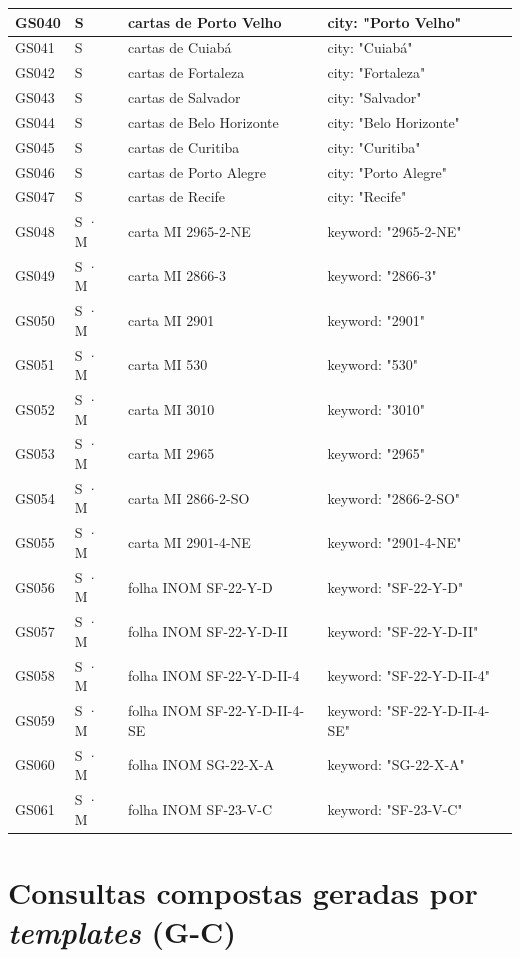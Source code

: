 {\begin{longtable}{|p{1.1cm}|p{1.3cm}|p{5.4cm}|p{6.3cm}|}
GS040 & S & cartas de Porto Velho & city: "Porto Velho" \\ \hline
GS041 & S & cartas de Cuiabá & city: "Cuiabá" \\ \hline
GS042 & S & cartas de Fortaleza & city: "Fortaleza" \\ \hline
GS043 & S & cartas de Salvador & city: "Salvador" \\ \hline
GS044 & S & cartas de Belo Horizonte & city: "Belo Horizonte" \\ \hline
GS045 & S & cartas de Curitiba & city: "Curitiba" \\ \hline
GS046 & S & cartas de Porto Alegre & city: "Porto Alegre" \\ \hline
GS047 & S & cartas de Recife & city: "Recife" \\ \hline
GS048 & S · M & carta MI 2965-2-NE & keyword: "2965-2-NE" \\ \hline
GS049 & S · M & carta MI 2866-3 & keyword: "2866-3" \\ \hline
GS050 & S · M & carta MI 2901 & keyword: "2901" \\ \hline
GS051 & S · M & carta MI 530 & keyword: "530" \\ \hline
GS052 & S · M & carta MI 3010 & keyword: "3010" \\ \hline
GS053 & S · M & carta MI 2965 & keyword: "2965" \\ \hline
GS054 & S · M & carta MI 2866-2-SO & keyword: "2866-2-SO" \\ \hline
GS055 & S · M & carta MI 2901-4-NE & keyword: "2901-4-NE" \\ \hline
GS056 & S · M & folha INOM SF-22-Y-D & keyword: "SF-22-Y-D" \\ \hline
GS057 & S · M & folha INOM SF-22-Y-D-II & keyword: "SF-22-Y-D-II" \\ \hline
GS058 & S · M & folha INOM SF-22-Y-D-II-4 & keyword: "SF-22-Y-D-II-4" \\ \hline
GS059 & S · M & folha INOM SF-22-Y-D-II-4-SE & keyword: "SF-22-Y-D-II-4-SE" \\ \hline
GS060 & S · M & folha INOM SG-22-X-A & keyword: "SG-22-X-A" \\ \hline
GS061 & S · M & folha INOM SF-23-V-C & keyword: "SF-23-V-C" \\ \hline
\end{longtable}
\addtocounter{table}{-1}
}

\section{Consultas compostas geradas por \textit{templates} (G-C)}

